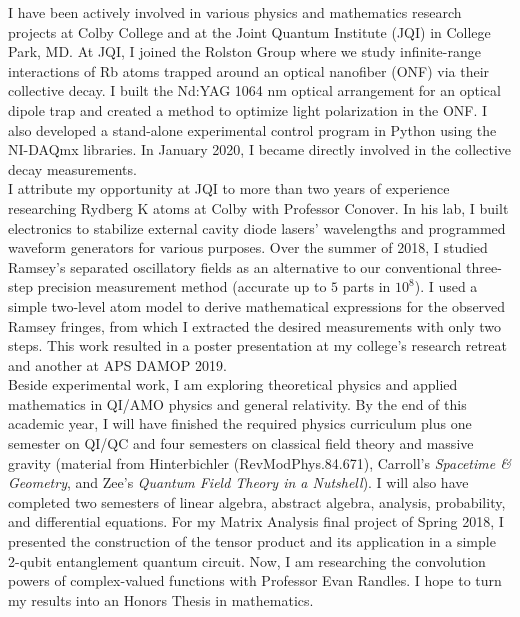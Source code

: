 \documentclass[10pt]{article}
\begin{document}
\noindent I have been actively involved in various physics and mathematics research projects at Colby College and at the Joint Quantum Institute (JQI) in College Park, MD. At JQI, I joined the Rolston Group where we study infinite-range interactions of Rb atoms trapped around an optical nanofiber (ONF) via their collective decay. 
I built the Nd:YAG 1064 nm optical arrangement for an optical dipole trap and created a method to optimize light polarization in the ONF. I also developed a stand-alone experimental control program in Python using the NI-DAQmx libraries. In January 2020, I became directly involved in the collective decay measurements.\\ 

\noindent I attribute my opportunity at JQI to more than two years of experience researching Rydberg K atoms at Colby with Professor Conover. In his lab, I built electronics to stabilize external cavity diode lasers' wavelengths and programmed waveform generators for various purposes. Over the summer of 2018, I studied Ramsey's separated oscillatory fields as an alternative to our conventional three-step precision measurement method (accurate up to $5$ parts in $10^8$). I used a simple two-level atom model to derive mathematical expressions for the observed Ramsey fringes, from which I extracted the desired measurements with only two steps. This work resulted in a poster presentation at my college's research retreat and another at APS DAMOP 2019.  \\


\noindent Beside experimental work, I am exploring theoretical physics and applied mathematics in QI/AMO physics and general relativity. By the end of this academic year, I will have finished the required physics curriculum plus one semester on QI/QC and four semesters on classical field theory and massive gravity (material from Hinterbichler  (RevModPhys.84.671), Carroll's \textit{Spacetime \& Geometry}, and Zee's \textit{Quantum Field Theory in a Nutshell}). I will also have completed two semesters of linear algebra, abstract algebra, analysis, probability, and differential equations. For my Matrix Analysis final project of Spring 2018, I presented the construction of the tensor product and its application in a simple 2-qubit entanglement quantum circuit. Now, I am researching the convolution powers of complex-valued functions with Professor Evan Randles. I hope to turn my results into an Honors Thesis in mathematics. \\
\end{document}
